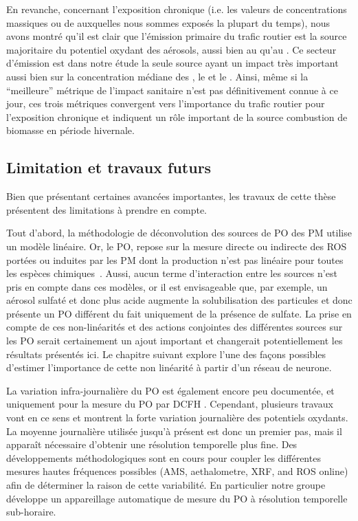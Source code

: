En revanche, concernant l'exposition chronique (i.e. les valeurs de concentrations
massiques ou de \POv{} auxquelles nous sommes exposés la plupart du temps),
nous avons montré qu'il est clair que
l'émission primaire du trafic routier est la source majoritaire du potentiel oxydant des
aérosols, aussi bien au \POAA{} qu'au \PODTT. Ce secteur d'émission est dans notre étude
la seule source ayant un impact très important aussi bien sur la concentration médiane des
\PMdix{}, le \POAAv{} et le \PODTTv.
Ainsi, même si la ``meilleure'' métrique de l'impact sanitaire n'est pas définitivement
connue à ce jour, ces trois métriques convergent vers l'importance du trafic routier pour
l'exposition chronique et indiquent un rôle important de la source combustion de biomasse
en période hivernale.

\subsection{Limitation et travaux futurs}%
\label{sub:limitation_et_travaux_futur}

Bien que présentant certaines avancées importantes, les travaux de cette thèse présentent
des limitations à prendre en compte.

Tout d'abord, la méthodologie de déconvolution des sources de PO des PM utilise un modèle
linéaire. Or, le PO, repose sur la mesure directe ou indirecte des ROS portées ou induites
par les PM dont la production n'est pas linéaire pour toutes les espèces
chimiques~\autocite{charrierDithiothreitol2012,sauvainComparison2013,charrierRates2015,charrierBias2016,calasImportance2017}.
Aussi, aucun terme d'interaction entre les sources n'est pris en compte dans ces modèles,
or il est envisageable que, par exemple, un aérosol sulfaté et donc plus acide augmente la
solubilisation des particules et donc présente un PO différent du fait
uniquement de la présence de sulfate.  La prise en compte de ces non-linéarités et des
actions conjointes des différentes sources sur les PO serait certainement un ajout
important et changerait potentiellement les résultats présentés ici. Le chapitre suivant
explore l'une des façons possibles d'estimer l'importance de cette non linéarité à partir
d'un réseau de neurone.

La variation infra-journalière du PO est également encore peu documentée, et uniquement
pour la mesure du PO par DCFH \autocite{venkatachariMeasurement2005,costabileFirst2017}.
Cependant, plusieurs travaux vont en ce sens
\autocite{zhouDevelopment2018,jovanovicMeasurements2019} et montrent la forte variation
journalière des potentiels oxydants.  La moyenne journalière utilisée jusqu'à présent est
donc un premier pas, mais il apparaît nécessaire d'obtenir une résolution temporelle plus
fine.  Des développements méthodologiques sont en cours pour coupler les différentes mesures hautes
fréquences possibles (AMS, aethalometre, XRF, and ROS online) afin de déterminer la raison
de cette variabilité.
En particulier notre groupe développe un appareillage automatique de mesure du PO à
résolution temporelle sub-horaire.

